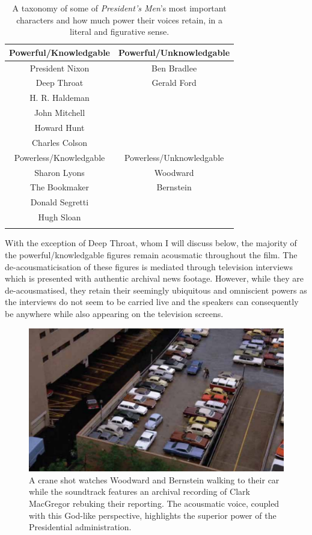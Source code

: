 \begin{table}
    \centering
    \begin{tabular}{cc}\toprule
         Powerful/Knowledgable& Powerful/Unknowledgable \\\midrule
         President Nixon& Ben Bradlee \\
 Deep Throat& Gerald Ford\\
 H. R. Haldeman& \\
 John Mitchell& \\
 Howard Hunt& \\
 Charles Colson& \\ \bottomrule
 Powerless/Knowledgable& Powerless/Unknowledgable \\\midrule
 Sharon Lyons& Woodward \\
 The Bookmaker& Bernstein \\
 Donald Segretti& \\
 Hugh Sloan& \\
 & \\
    \end{tabular}
    \caption{A taxonomy of some of \textit{President's Men}'s most important characters and how much power their voices retain, in a literal and figurative sense.}
    \label{tab:power-matrix}
\end{table}

With the exception of Deep Throat, whom I will discuss below, the majority of the powerful/knowledgable figures remain acousmatic throughout the film.
The de-acousmaticisation of these figures is mediated through television interviews which is presented with authentic archival news footage.
However, while they are de-acousmatised, they retain their seemingly ubiquitous and omniscient powers as the interviews do not seem to be carried live and the speakers can consequently be anywhere while also appearing on the television screens.
\begin{figure}
    \centering
    \includegraphics[width=1\linewidth]{img/president-macgregor.pdf}
    \caption{A crane shot watches Woodward and Bernstein walking to their car while the soundtrack features an archival recording of Clark MacGregor rebuking their reporting. The acousmatic voice, coupled with this God-like perspective, highlights the superior power of the Presidential administration.}
    \label{fig:president-macgregor}
\end{figure}


